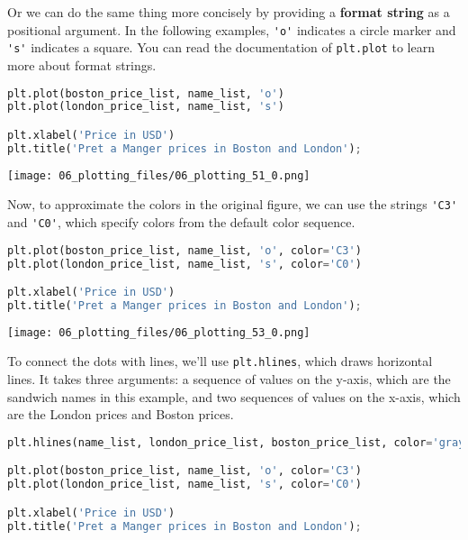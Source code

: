 Or we can do the same thing more concisely by providing a \textbf{format
string} as a positional argument. In the following examples,
\passthrough{\lstinline!'o'!} indicates a circle marker and
\passthrough{\lstinline!'s'!} indicates a square. You can read the
documentation of \passthrough{\lstinline!plt.plot!} to learn more about
format strings.

\begin{lstlisting}[language=Python,style=source]
plt.plot(boston_price_list, name_list, 'o')
plt.plot(london_price_list, name_list, 's')

plt.xlabel('Price in USD')
plt.title('Pret a Manger prices in Boston and London');
\end{lstlisting}

\begin{center}
\texttt{[image: 06\_plotting\_files/06\_plotting\_51\_0.png]}
\end{center}

Now, to approximate the colors in the original figure, we can use the
strings \passthrough{\lstinline!'C3'!} and
\passthrough{\lstinline!'C0'!}, which specify colors from the default
color sequence.

\begin{lstlisting}[language=Python,style=source]
plt.plot(boston_price_list, name_list, 'o', color='C3')
plt.plot(london_price_list, name_list, 's', color='C0')

plt.xlabel('Price in USD')
plt.title('Pret a Manger prices in Boston and London');
\end{lstlisting}

\begin{center}
\texttt{[image: 06\_plotting\_files/06\_plotting\_53\_0.png]}
\end{center}

To connect the dots with lines, we'll use
\passthrough{\lstinline!plt.hlines!}, which draws horizontal lines. It
takes three arguments: a sequence of values on the y-axis, which are the
sandwich names in this example, and two sequences of values on the
x-axis, which are the London prices and Boston prices.

\pagebreak

\begin{lstlisting}[language=Python,style=source]
plt.hlines(name_list, london_price_list, boston_price_list, color='gray')

plt.plot(boston_price_list, name_list, 'o', color='C3')
plt.plot(london_price_list, name_list, 's', color='C0')

plt.xlabel('Price in USD')
plt.title('Pret a Manger prices in Boston and London');
\end{lstlisting}

